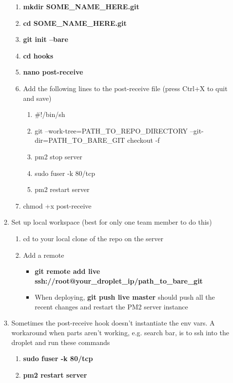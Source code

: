 \documentclass{article}
\begin{document}
\begin{enumerate}
\begin{enumerate}
\begin{enumerate}
      \item \textbf{mkdir SOME\_NAME\_HERE.git}
      \item \textbf{cd SOME\_NAME\_HERE.git}
      \item \textbf{git init --bare}
      \item \textbf{cd hooks}
      \item \textbf{nano post-receive}
      \item Add the following lines to the post-receive file (press Ctrl+X to quit and save)
      \begin{enumerate}
        \item \#!/bin/sh
        \item git --work-tree=PATH\_TO\_REPO\_DIRECTORY --git-dir=PATH\_TO\_BARE\_GIT checkout -f
        \item pm2 stop server
        \item sudo fuser -k 80/tcp
        \item pm2 restart server
      \end{enumerate}
      \item chmod +x post-receive
    \end{enumerate}
    \item Set up local workspace (best for only one team member to do this)
    \begin{enumerate}
      \item cd to your local clone of the repo on the server
      \item Add a remote
      \begin{itemize}
        \item \textbf{git remote add live ssh://root@your\_droplet\_ip/path\_to\_bare\_git}
        \item When deploying, \textbf{git push live master} should push all the recent changes and restart the PM2 server instance
      \end{itemize}
    \end{enumerate}
    \item Sometimes the post-receive hook doesn't instantiate the env vars. A workaround when parts aren't working, e.g. search bar, is to ssh into the droplet and run these commands
    \begin{enumerate}
      \item \textbf{ sudo fuser -k 80/tcp}
      \item \textbf{pm2 restart server}
    \end{enumerate}
  \end{enumerate}
\end{enumerate}
\end{document}
